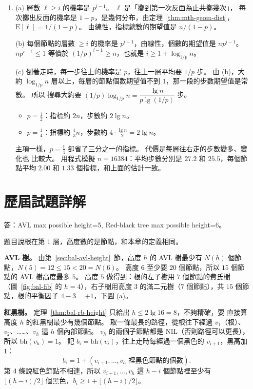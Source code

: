 \begin{enumerate}
\item (a) 層數 $\ell \ge i$ 的機率是 $p^{i-1}$。 $\ell$ 是「擲到第一次反面為止共擲幾次」，
每次擲出反面的機率是 $1 - p$，是幾何分布，由定理~\ref{thm:mth-geom-dist}，
$\mathrm{E}[\ell] = 1/(1-p)$。 由線性，指標總數的期望值是 $n/(1-p)$。

(b) 每個節點的層數 $\ge i$ 的機率是 $p^{i-1}$，由線性，個數的期望值是 $n p^{i-1}$。
$n p^{i-1} \le 1$ 等價於 $(1/p)^{i-1} \ge n$，也就是 $i \ge 1 + \log_{1/p} n$。

(c) 倒著走時，每一步往上的機率是 $p$，往上一層平均要 $1/p$ 步。 由 (b)，大約
$\log_{1/p} n$ 層以上，每層的節點個數期望值不到 $1$，那一段的步數期望值是常數。 所以
搜尋大約要 $(1/p) \log_{1/p} n = \dfrac{\lg n}{p \lg(1/p)}$ 步。
\begin{itemize}
\item $p = \frac12$：指標約 $2n$，步數約 $2 \lg n$。
\item $p = \frac14$：指標約 $\frac43 n$，步數約 $4 \cdot \frac{\lg n}{2} = 2\lg n$。
\end{itemize}
主項一樣，$p = \frac14$ 卻省了三分之一的指標。 代價是每層往右走的步數變多、變化也
比較大。 用程式模擬 $n = 16384$：平均步數分別是 $27.2$ 和 $25.5$，每個節點平均
$2.00$ 和 $1.33$ 個指標，和上面的估計一致。

\end{enumerate}

\section*{歷屆試題詳解}

答：AVL max possible height=5, Red-black tree max possible height=6。

題目說根在第 $1$ 層，高度數的是節點，和本章的定義相同。

\textbf{AVL 樹。} 由第~\ref{sec:bal-avl-height}~節，高度 $h$ 的 AVL 樹最少有 $N(h)$
個節點，$N(5) = 12 \le 15 < 20 = N(6)$。 高度 $6$ 至少要 $20$ 個節點，所以 $15$ 個節
點的 AVL 樹高度最多 $5$。 高度 $5$ 做得到：根的左子樹用 $7$ 個節點的費氏樹
（圖~\ref{fig:bal-fib} 的 $h = 4$），右子樹用高度 $3$ 的滿二元樹（$7$ 個節點），共
$15$ 個節點，根的平衡因子 $4 - 3 = +1$，下圖 (a)。

\textbf{紅黑樹。} 定理~\ref{thm:bal-rb-height} 只給出 $h \le 2\lg 16 = 8$，不夠精確，要
直接算高度 $h$ 的紅黑樹最少有幾個節點。 取一條最長的路徑，從根往下經過 $v_1$（根）、
$v_2$、……、$v_h$ 這 $h$ 個內部節點。 $v_h$ 的兩個子節點都是 NIL（否則路徑可以更長），
所以 $\mathrm{bh}(v_h) = 1$。 記 $b_i = \mathrm{bh}(v_i)$，往上走時每經過一個黑色的
$v_{i+1}$，黑高加 $1$：
\[
b_i = 1 + (v_{i+1}, \ldots, v_h \text{ 裡黑色節點的個數}).
\]
第 4 條說紅色節點不相連，所以 $v_{i+1}, \ldots, v_h$ 這 $h - i$ 個節點裡至少有
$\lfloor (h - i)/2 \rfloor$ 個黑色，$b_i \ge 1 + \lfloor (h-i)/2 \rfloor$。

